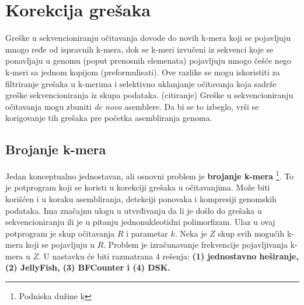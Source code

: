 \documentclass[12pt,oneside]{memoir}
\begin{document}
\section{Korekcija grešaka}

Greške u sekvencioniranju očitavanja dovode do novih k-mera koji se pojavljuju mnogo ređe od ispravnih k-mera, dok se k-meri izvučeni iz sekvenci koje se ponavljaju u genomu (poput prenosnih elemenata) pojavljuju mnogo češće nego k-meri sa jednom kopijom (preformulisati). Ove razlike se mogu iskoristiti za filtriranje grešaka u k-merima i selektivno uklanjanje očitavanja koja sadrže greške sekvencioniranja iz skupa podataka. (citiranje)
Greške u sekvencioniranju očitavanja mogu zbuniti \textit{de novo} asemblere. Da bi se to izbeglo, vrši se korigovanje tih grešaka pre početka asembliranja genoma.

\subsection{Brojanje k-mera}

Jedan konceptualno jednostavan, ali osnovni problem je \textbf{brojanje k-mera} \footnote{Podniska dužine k}. To je potprogram koji se koristi u korekciji grešaka u očitavanjima. Može biti korišćen i u koraku asembliranja, detekciji ponovaka i kompresiji genomskih podataka. Ima značajnu ulogu u utvrđivanju da li je došlo do grešaka u sekvencioniranju ili je u pitanju jednonukleotidni polimorfizam. Ulaz u ovaj potprogram je skup očitavanja $R$ i parametar $k$. Neka je $Z$ skup svih mogućih k-mera koji se pojavljuju u $R$. Problem je izračunavanje frekvencije pojavljivanja k-mera u $Z$. U nastavku će biti razmatrana 4 rešenja: \textbf{(1) jednostavno heširanje, (2) JellyFish, (3) BFCounter i (4) DSK.}

\newpage
\end{document}
